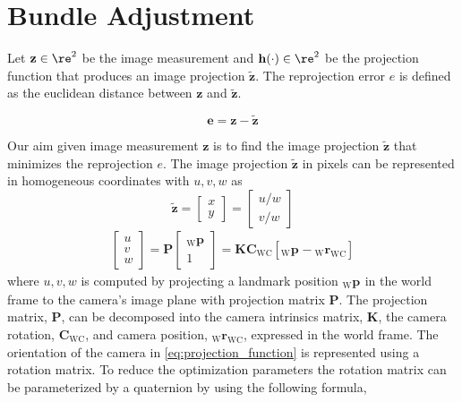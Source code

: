 \documentclass{report}
\renewcommand{\Vec}[1]{{\mathbf{#1}}}
\newcommand{\Mat}[1]{{\mathbf{#1}}}
\newcommand{\cam}{{\text{C}}}
\newcommand{\world}{{\text{W}}}
\newcommand{\KineNotationTransform}[3]{{{#1}_{#2#3}}}
\newcommand{\KineNotation}[3]{{{{}_{#2}} {#1}_{#2#3}}}
\newcommand{\KineNotationPart}[3]{{{{}_{#2}} {#1}_{#3}}}
\newcommand{\pos}{{\Vec{r}}}
\newcommand{\Pos}[2]{{\KineNotation{\pos}{#1}{#2}}}
\newcommand{\rot}{{\Mat{C}}}
\newcommand{\Rot}[2]{{\KineNotationTransform{\rot}{#1}{#2}}}
\newcommand{\point}{\Vec{p}}
\newcommand{\Pt}[1]{{\KineNotationPart{\point}{#1}{}}}
\newcommand{\error}{{\Vec{e}}}
\newcommand{\camRot}{{\Rot{\world}{\cam}}}
\newcommand{\camPos}{{\Pos{\world}{\cam}}}
\newcommand{\projFunc}{{\Vec{h}}}
\newcommand{\measurement}{{\Vec{z}}}
\newcommand{\estimate}{{\tilde{\Vec{z}}}}
\begin{document}
\section{Bundle Adjustment}

Let $\measurement \in \re^{2}$ be the image measurement and $\projFunc(\cdot)
\in \re^{2}$ be the projection function that produces an image projection
$\estimate$. The reprojection error $e$ is defined as the euclidean distance
between $\measurement$ and $\estimate$.

\begin{equation}
  \error = \measurement - \estimate
\end{equation}

Our aim given image measurement $\measurement$ is to find the image projection
$\estimate$ that minimizes the reprojection $e$. The image projection
$\estimate$ in pixels can be represented in homogeneous coordinates with
$u, v, w$ as
%
\begin{equation}
  \estimate
  = \begin{bmatrix} x \\ y \end{bmatrix}
  = \begin{bmatrix} u / w \\ v / w \end{bmatrix}
\end{equation}
%
\begin{align}
  \label{eq:projection_function}
  \begin{bmatrix} u \\ v \\ w \end{bmatrix}
    = \Mat{P} \begin{bmatrix} \Pt{\world} \\ 1 \end{bmatrix}
      = \Mat{K} \camRot [\Pt{\world} - \camPos]
\end{align}
%
where $u, v, w$ is computed by projecting a landmark position $\Pt{\world}$ in
the world frame to the camera's image plane with projection matrix $\Mat{P}$.
The projection matrix, $\Mat{P}$, can be decomposed into the camera intrinsics
matrix, $\Mat{K}$, the camera rotation, $\camRot$, and camera position,
$\camPos$, expressed in the world frame.
%
The orientation of the camera in \eqref{eq:projection_function} is
represented using a rotation matrix. To reduce the optimization parameters
the rotation matrix can be parameterized by a quaternion by using the following
formula,
%
\end{document}
